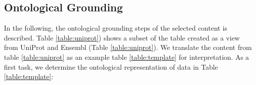 

\subsection*{Ontological Grounding}

In the following, the ontological grounding steps of the selected content is described. 
%
Table \ref{table:uniprot}) shows a subset of the table created as a view from UniProt and Ensembl (Table \ref{table:uniprot}). We translate the content from table \ref{table:uniprot} as an example table \ref{table:template} for interpretation. 
As a first task, we determine the ontological representation of data in Table \ref{table:template}: 

